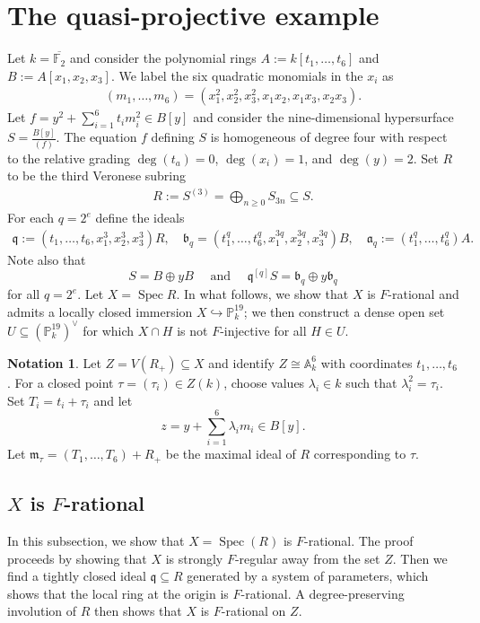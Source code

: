 \documentclass[reqno,11pt]{amsart}
\numberwithin{equation}{section}
\theoremstyle{definition}
\theoremstyle{definition}
\newtheorem{notation}[theorem]{Notation}
\theoremstyle{definition}
\theoremstyle{remark}
\newcommand{\Spec}{\operatorname{Spec}}
\newcommand{\F}{\mathbb{F}}
\newcommand{\PP}{\mathbb{P}}
\newcommand{\A}{\mathbb{A}}
\newcommand{\fm}{\mathfrak{m}}
\newcommand{\fq}{\mathfrak{q}}
\newcommand{\fa}{\mathfrak{a}}
\newcommand{\fb}{\mathfrak{b}}
\begin{document}
\section{The quasi-projective example}\label{section quasi-projective example}
Let $k=\overline{\F_2}$ and consider the polynomial rings $A:=k[t_1,\dots, t_6]$ and $B:=A[x_1,x_2,x_3]$. We label the six quadratic monomials in the $x_i$ as 
\begin{align}
    (m_1,\ldots,m_6)=(x_1^2,x_2^2,x_3^2,x_1x_2,x_1x_3,x_2x_3).
\end{align}
Let $f=y^2+\sum\limits_{i=1}^6 t_im_i^2\in B[y]$ and consider the nine-dimensional hypersurface $S=\frac{B[y]}{(f)}.$
The equation $f$ defining $S$ is homogeneous of degree four with respect to the relative grading $\deg(t_a)=0$, $\deg(x_i)=1$, and $\deg(y)=2$. Set $R$ to be the third Veronese subring
\begin{align*}
    R:=S^{(3)}=\bigoplus\limits_{n\geq 0}S_{3n}\subseteq S.
\end{align*}
For each $q=2^e$ define the ideals
\begin{align*}
    \fq:=(t_1,\ldots,t_6,x_1^3,x_2^3,x_3^3)R,\quad \fb_q=(t_1^q,\ldots,t_6^q,x_1^{3q},x_2^{3q},x_3^{3q})B,\quad \fa_{q}:=(t_1^{q},\ldots, t_6^q)A.
\end{align*}
Note also that
\begin{equation}
    S=B\oplus yB \quad \text{ and }\quad\fq^{[q]}S=\fb_q\oplus y\fb_q\label{eq:S-direct-sum}
\end{equation}
 for all $q=2^e$. Let $X=\Spec R$. In what follows, we show that $X$ is $F$-rational and admits a locally closed immersion $X\hookrightarrow \PP^{19}_k$; we then construct a dense open set $U\subseteq (\PP^{19}_k)^{\vee}$ for which $X\cap H$ is not $F$-injective for all $H\in U$.

\begin{notation}
     Let $Z = V(R_+)\subseteq X$ and identify $Z\cong \A_k^6$ with coordinates $t_1,\ldots, t_6$. For a closed point $\tau=(\tau_i)\in Z(k)$, choose values $\lambda_i\in k$ such that $\lambda_i^2=\tau_i$. Set $T_i=t_i+\tau_i$ and let $$z=y+\sum\limits_{i=1}^6\lambda_i m_i\in B[y].$$ Let $\fm_\tau=(T_1,\ldots, T_6)+R_+$ be the maximal ideal of $R$ corresponding to $\tau$.
\end{notation}



\subsection{\texorpdfstring{$X$}{X} is \texorpdfstring{$F$}{F}-rational}
In this subsection, we show that $X=\Spec(R)$ is $F$-rational. The proof proceeds by showing that $X$ is strongly $F$-regular away from the set $Z$. Then we find a tightly closed ideal $\fq\subseteq R$ generated by a system of parameters, which shows that the local ring at the origin is $F$-rational. A degree-preserving involution of $R$ then shows that $X$ is $F$-rational on $Z$.
\end{document}
